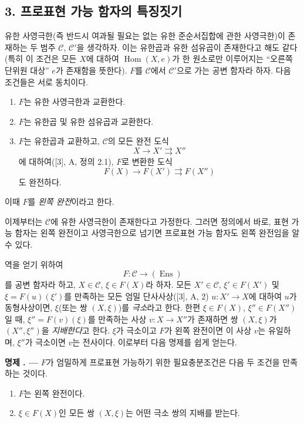 \documentclass[11pt,twoside,openany]{book}
\numberwithin{equation}{section}
\newcommand{\sourceunit}{front}
\newcommand{\src}[1]{%
  \phantomsection\hypertarget{src:\sourceunit:#1}{}%
  \marginpar{\raggedleft\footnotesize\sffamily #1}%
}
\theoremstyle{plain}
\theoremstyle{definition}
\theoremstyle{remark}
\newcommand{\result}[2]{%
  \par\medskip\noindent\textbf{#1%
  \if\relax\detokenize{#2}\relax\else\space#2\fi. ---}\enspace
}
\begin{document}
\subsection*{3. 프로표현 가능 함자의 특징짓기}

유한 사영극한(즉 반드시 여과될 필요는 없는 유한 준순서집합에 관한
사영극한)이 존재하는 두 범주 $\mathcal C$, $\mathcal C'$을 생각하자. 이는
유한곱과 유한 섬유곱이 존재한다고 해도 같다(특히 이 조건은 모든 $X$에
대하여 $\operatorname{Hom}(X,e)$가 한 원소로만 이루어지는 ``오른쪽 단위원
대상'' $e$가 존재함을 뜻한다). $F$를 $\mathcal C$에서 $\mathcal C'$으로 가는
공변 함자라 하자. 다음 조건들은 서로 동치이다.

\begin{enumerate}
\item[(i)] $F$는 유한 사영극한과 교환한다.
\item[(ii)] $F$는 유한곱 및 유한 섬유곱과 교환한다.
\item[(iii)] $F$는 유한곱과 교환하고, $\mathcal C$의 모든 완전 도식
\[
  X\longrightarrow X'\rightrightarrows X''
\]
에 대하여([3], A, 정의 2.1), $F$로 변환한 도식
\[
  F(X)\longrightarrow F(X')\rightrightarrows F(X'')
\]
도 완전하다.
\end{enumerate}

이때 $F$를 \emph{왼쪽 완전}이라고 한다.

이제부터는 $\mathcal C$에 유한 사영극한이 존재한다고 가정한다. 그러면
정의에서 바로, 표현 가능 함자는 왼쪽 완전이고 사영극한으로 넘기면
프로표현 가능 함자도 왼쪽 완전임을 알 수 있다.

역을 얻기 위하여
\[
  F:\mathcal C\longrightarrow(\operatorname{Ens})
\]
를 공변 함자라 하고, $X\in\mathcal C$, $\xi\in F(X)$라 하자. 모든
$X'\in\mathcal C$, $\xi'\in F(X')$ 및 $\xi=F(u)(\xi')$를 만족하는 모든
엄밀 단사사상([3], A, 2) $u:X'\longrightarrow X$에 대하여 $u$가
동형사상이면, $\xi$(또는 쌍 \src{374}$(X,\xi)$)를 \emph{극소}라고 한다.
한편 $\xi\in F(X)$, $\xi''\in F(X'')$일 때, $\xi''=F(v)(\xi)$를 만족하는
사상 $v:X\longrightarrow X''$가 존재하면 쌍 $(X,\xi)$가 $(X'',\xi'')$을
\emph{지배한다}고 한다. $\xi$가 극소이고 $F$가 왼쪽 완전이면 이 사상
$v$는 유일하며, $\xi''$가 극소이면 $v$는 전사이다. 이로부터 다음 명제를
쉽게 얻는다.

\result{명제}{3.1} $F$가 엄밀하게 프로표현 가능하기 위한 필요충분조건은
다음 두 조건을 만족하는 것이다.
\begin{enumerate}
\item[(i)] $F$는 왼쪽 완전이다.
\item[(ii)] $\xi\in F(X)$인 모든 쌍 $(X,\xi)$는 어떤 극소 쌍의 지배를
받는다.
\end{enumerate}
\end{document}
